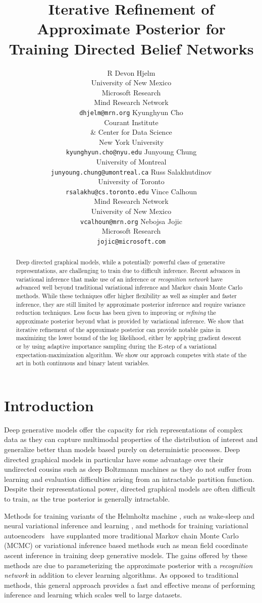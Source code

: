 \documentclass{article} %
\title{Iterative Refinement of \\ Approximate Posterior for \\ Training Directed Belief Networks}
\author{R Devon Hjelm \\
University of New Mexico \\  Microsoft Research \\ Mind Research Network \\
\texttt{\small dhjelm@mrn.org} 
\And
Kyunghyun Cho \\
Courant Institute \\ \& Center for Data Science \\
New York University \\
\texttt{\small kyunghyun.cho@nyu.edu}
\And
Junyoung Chung \\
University of Montreal \\
\texttt{\small junyoung.chung@umontreal.ca}
\And
Russ Salakhutdinov \\
University of Toronto \\
\texttt{\small rsalakhu@cs.toronto.edu}
\And
Vince Calhoun \\
Mind Research Network \\ University of New Mexico \\
\texttt{\small vcalhoun@mrn.org}
\And
Nebojsa Jojic \\
Microsoft Research \\
\texttt{\small jojic@microsoft.com}
}
\begin{document}
\maketitle

\begin{abstract}
    Deep directed graphical models, while a potentially powerful
    class of generative representations, are challenging to train due to difficult inference. Recent advances in variational inference that make use
    of an inference or \emph{recognition network} have advanced well beyond
    traditional variational inference and Markov chain Monte Carlo methods. While these techniques
    offer higher flexibility as well as simpler and faster inference, they are
    still limited by approximate posterior inference and require variance
    reduction techniques. Less focus has been given to improving or \emph{refining} the
    approximate posterior beyond what is provided by variational inference. We
    show that iterative refinement of the approximate posterior can provide
    notable gains in maximizing the lower bound of the log likelihood, either
    by applying gradient descent or by using adaptive importance sampling
    during the E-step of a variational expectation-maximization algorithm. We show our approach
    competes with state of the art in both continuous and binary latent
    variables.
    \end{abstract}

\section{Introduction}

Deep generative models offer the capacity for rich representations of complex
data as they can capture multimodal properties of the distribution of
interest and generalize better than models based purely on deterministic processes. Deep directed
graphical models in particular have some advantage over their undirected
cousins such as deep Boltzmann machines \citep[DBMs,][]{salakhutdinov2009deep} as they do not suffer from
learning and evaluation difficulties arising from an intractable partition
function. Despite their representational power, directed graphical models are
often difficult to train, as the true posterior is generally intractable.

Methods for training variants of the Helmholtz machine
\citep{dayan1995helmholtz}, such as wake-sleep \citep{hinton1995wake,
bornschein2014reweighted} and neural variational inference and learning
\citep[NVIL,][]{mnih2014neural}, and methods for training variational
autoencoders~ \citep[VAE,][]{kingma2013auto} have supplanted more traditional
Markov chain Monte Carlo (MCMC) \citep{neal1992connectionist} or variational
inference based methods such as mean field coordinate ascent inference
\citep{saul1996mean} in training deep generative models. The gains offered by
these methods are due to parameterizing the approximate posterior with a
\emph{recognition network} in addition to clever learning algorithms. As opposed to
traditional methods, this general approach provides a fast and effective means
of performing inference and learning which scales well to large datasets.
\end{document}
